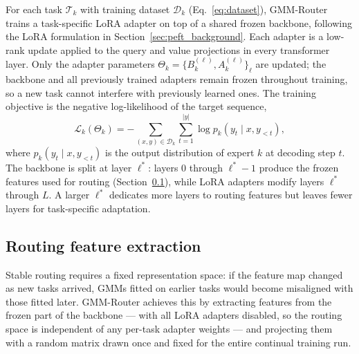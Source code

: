 For each task $\mathcal{T}_k$ with training dataset $\mathcal{D}_k$ (Eq.~\eqref{eq:dataset}), GMM-Router trains a task-specific LoRA adapter \citep{hu2022lora} on top of a shared frozen backbone, following the LoRA formulation in Section~\ref{sec:peft_background}. Each adapter is a low-rank update applied to the query and value projections in every transformer layer. Only the adapter parameters $\Theta_k=\{B_k^{(\ell)},A_k^{(\ell)}\}_\ell$ are updated; the backbone and all previously trained adapters remain frozen throughout training, so a new task cannot interfere with previously learned ones. The training objective is the negative log-likelihood of the target sequence,
\begin{equation}
    \mathcal{L}_k(\Theta_k) = -\sum_{(x,y)\in\mathcal{D}_k} \sum_{t=1}^{|y|}
    \log p_k(y_t \mid x, y_{<t}),
    \label{eq:task_loss}
\end{equation}
where $p_k(y_t\mid x,y_{<t})$ is the output distribution of expert $k$ at decoding step $t$. The backbone is split at layer $\ell^*$: layers $0$ through $\ell^*{-}1$ produce the frozen features used for routing (Section~\ref{sec:features}), while LoRA adapters modify layers $\ell^*$ through $L$. A larger $\ell^*$ dedicates more layers to routing features but leaves fewer layers for task-specific adaptation.

\subsection{Routing feature extraction}
\label{sec:features}

Stable routing requires a fixed representation space: if the feature map changed as new tasks arrived, GMMs fitted on earlier tasks would become misaligned with those fitted later. GMM-Router achieves this by extracting features from the frozen part of the backbone --- with all LoRA adapters disabled, so the routing space is independent of any per-task adapter weights --- and projecting them with a random matrix drawn once and fixed for the entire continual training run.

